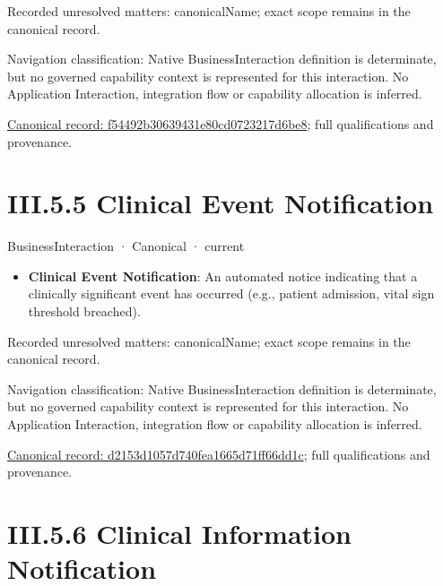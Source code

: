 {\small Recorded unresolved matters: canonicalName; exact scope remains in the canonical record.}\par
{\small Navigation classification: Native BusinessInteraction definition is determinate, but no governed capability context is represented for this interaction. No Application Interaction, integration flow or capability allocation is inferred.}\par
{\footnotesize \href{../../../../../../../continuum/business/business-interaction/f54492b30639431e80cd0723217d6be8.md}{Canonical record: f54492b30639431e80cd0723217d6be8}; full qualifications and provenance.}\par
\section*{III.5.5 Clinical Event Notification}
\label{navigation:III.5.5}

\label{element:d2153d1057d740fea1665d71ff66dd1c}
{\small BusinessInteraction · Canonical · current}\par

\begin{itemize}


\item \textbf{Clinical Event Notification}: An automated notice indicating that a clinically significant event has occurred (e.g., patient admission, vital sign threshold breached).

\end{itemize}

{\small Recorded unresolved matters: canonicalName; exact scope remains in the canonical record.}\par
{\small Navigation classification: Native BusinessInteraction definition is determinate, but no governed capability context is represented for this interaction. No Application Interaction, integration flow or capability allocation is inferred.}\par
{\footnotesize \href{../../../../../../../continuum/business/business-interaction/d2153d1057d740fea1665d71ff66dd1c.md}{Canonical record: d2153d1057d740fea1665d71ff66dd1c}; full qualifications and provenance.}\par
\section*{III.5.6 Clinical Information Notification}
\label{navigation:III.5.6}

